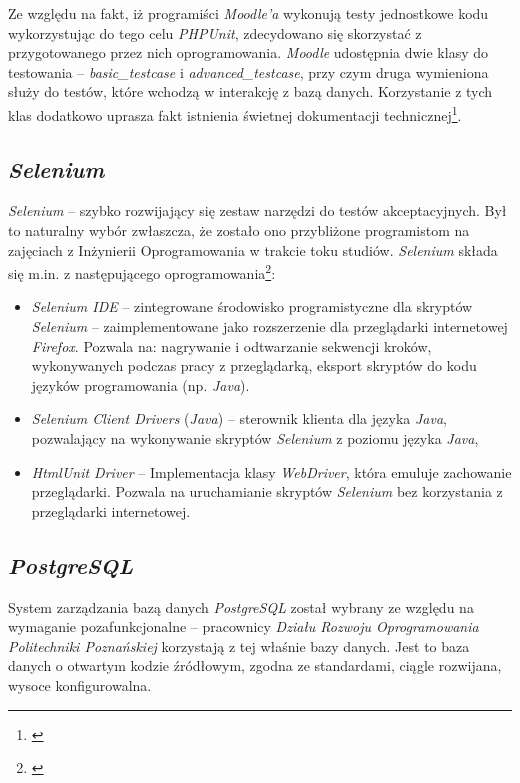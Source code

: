 Ze względu na fakt, iż programiści \textit{Moodle'a} wykonują testy jednostkowe kodu wykorzystując do tego celu \textit{PHPUnit}, zdecydowano się skorzystać z przygotowanego przez nich oprogramowania. \textit{Moodle} udostępnia dwie klasy do testowania -- \textit{basic\_testcase} i \textit{advanced\_testcase}, przy czym druga wymieniona służy do testów, które wchodzą w interakcję z bazą danych. Korzystanie z tych klas dodatkowo uprasza fakt istnienia świetnej dokumentacji technicznej\footnote{\cite{Man:PHPUnit}}.

\subsection{\textit{Selenium}}
\label{Chapter634}

\textit{Selenium} -- szybko rozwijający się zestaw narzędzi do testów akceptacyjnych. Był to naturalny wybór zwłaszcza, że zostało ono przybliżone programistom na zajęciach z Inżynierii Oprogramowania w trakcie toku studiów. \textit{Selenium} składa się m.in. z następującego oprogramowania\footnote{\cite{Man:Selenium}}:
\begin{itemize}
\item{\textit{Selenium IDE} -- zintegrowane środowisko programistyczne dla skryptów \textit{Selenium} -- zaimplementowane jako rozszerzenie dla przeglądarki internetowej \textit{Firefox}. Pozwala na: nagrywanie i odtwarzanie sekwencji kroków, wykonywanych podczas pracy z przeglądarką, eksport skryptów do kodu języków programowania (np. \textit{Java}).}
\item{\textit{Selenium Client Drivers} (\textit{Java}) -- sterownik klienta dla języka \textit{Java}, pozwalający na wykonywanie skryptów \textit{Selenium} z poziomu języka \textit{Java}},
\item{\textit{HtmlUnit Driver} -- Implementacja klasy \textit{WebDriver}, która emuluje zachowanie przeglądarki. Pozwala na uruchamianie skryptów \textit{Selenium} bez korzystania z przeglądarki internetowej.}
\end{itemize}

\subsection{\textit{PostgreSQL}}
\label{Chapter635}

System zarządzania bazą danych \textit{PostgreSQL} został wybrany ze względu na wymaganie pozafunkcjonalne -- pracownicy \textit{Działu Rozwoju Oprogramowania Politechniki Poznańskiej} korzystają z tej właśnie bazy danych. Jest to baza danych o otwartym kodzie źródłowym, zgodna ze standardami, ciągle rozwijana, wysoce konfigurowalna.

